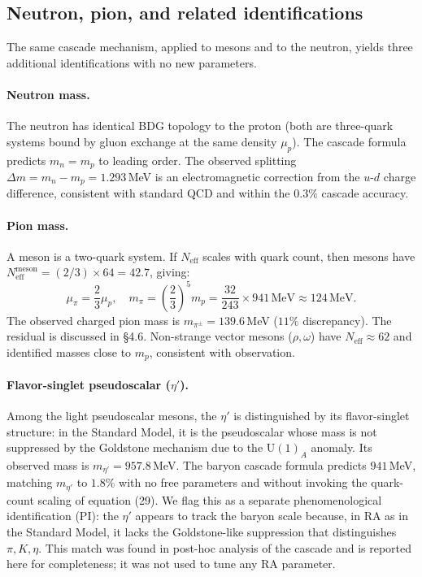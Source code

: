 \documentclass[11pt]{article}
\begin{document}
\subsection{Neutron, pion, and related identifications}

The same cascade mechanism, applied to mesons and to the neutron, yields three additional identifications with no new parameters.

\paragraph{Neutron mass.} The neutron has identical BDG topology to the proton (both are three-quark systems bound by gluon exchange at the same density $\mu_p$). The cascade formula predicts $m_n=m_p$ to leading order. The observed splitting $\Delta m=m_n-m_p=1.293$\,MeV is an electromagnetic correction from the $u$-$d$ charge difference, consistent with standard QCD and within the $0.3\%$ cascade accuracy.

\paragraph{Pion mass.} A meson is a two-quark system. If $N_{\mathrm{eff}}$ scales with quark count, then mesons have $N_{\mathrm{eff}}^{\mathrm{meson}}=(2/3)\times 64=42.7$, giving:
\begin{equation}
\mu_\pi = \frac{2}{3}\mu_p,\quad m_\pi = \left(\frac{2}{3}\right)^5 m_p = \frac{32}{243}\times 941\,\mathrm{MeV}\approx 124\,\mathrm{MeV}.
\end{equation}
The observed charged pion mass is $m_{\pi^\pm}=139.6$\,MeV ($11\%$ discrepancy). The residual is discussed in \S4.6. Non-strange vector mesons ($\rho,\omega$) have $N_{\mathrm{eff}}\approx 62$ and identified masses close to $m_p$, consistent with observation.

\paragraph{Flavor-singlet pseudoscalar ($\eta'$).} Among the light pseudoscalar mesons, the $\eta'$ is distinguished by its flavor-singlet structure: in the Standard Model, it is the pseudoscalar whose mass is not suppressed by the Goldstone mechanism due to the $\mathrm{U}(1)_A$ anomaly. Its observed mass is $m_{\eta'}=957.8$\,MeV. The baryon cascade formula predicts $941$\,MeV, matching $m_{\eta'}$ to $1.8\%$ with no free parameters and without invoking the quark-count scaling of equation (29). We flag this as a separate phenomenological identification (PI): the $\eta'$ appears to track the baryon scale because, in RA as in the Standard Model, it lacks the Goldstone-like suppression that distinguishes $\pi,K,\eta$. This match was found in post-hoc analysis of the cascade and is reported here for completeness; it was not used to tune any RA parameter.
\end{document}
